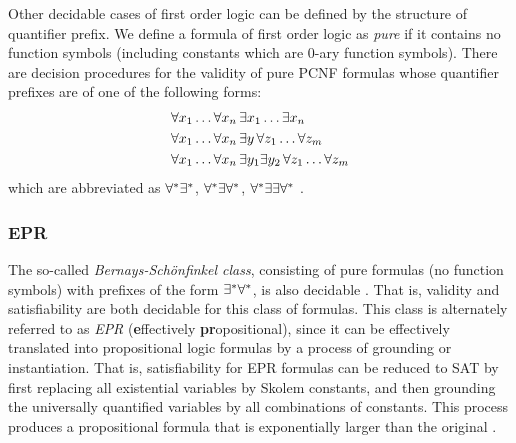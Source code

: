 \documentclass[10pt]{article}
\begin{document}
Other decidable cases of first order logic can be defined by the structure of quantifier prefix. We define a formula of first order logic as \textit{pure} if it contains no function symbols (including constants which are 0-ary function symbols). There are decision procedures for the validity of pure PCNF formulas whose quantifier prefixes are of one of the following forms:
\begin{align}
    &\forall x_1\dots\forall x_n \,\exists x_1\dots\exists x_n \\
    &\forall x_1\dots\forall x_n \, \exists y \, \forall z_1\dots\forall z_m \\
    &\forall x_1\dots\forall x_n \, \exists y_1 \exists y_2 \, \forall z_1\dots\forall z_m 
\end{align}  
which are abbreviated as $\forall^*\exists^*$, $\forall^*\exists\forall^*$, $\forall^*\exists\exists\forall^*$ \cite{Dreben1979TheDP}. 

\subsubsection*{EPR}

The so-called \textit{Bernays-Sch\"{o}nfinkel class}, consisting of pure formulas (no function symbols) with prefixes of the form $\exists^*\forall^*$, is also decidable \cite{lewis1980complexity}. That is, validity and satisfiability are both decidable for this class of formulas. This class is alternately referred to as \textit{EPR} (\textbf{e}ffectively \textbf{pr}opositional), since it can be effectively translated into propositional logic formulas by a process of grounding or instantiation. That is, satisfiability for EPR formulas can be reduced to SAT by first replacing all existential variables by Skolem constants, and then grounding the universally quantified variables by all combinations of constants. This process produces a propositional formula that is exponentially larger than the original \cite{demoura2008deciding}.


\end{document}
